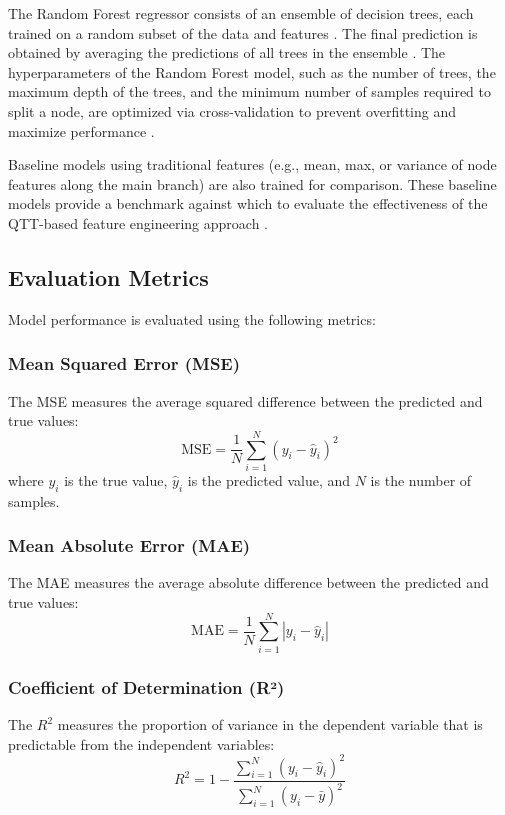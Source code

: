 \documentclass[twocolumn]{aastex631}
\begin{document}
The Random Forest regressor consists of an ensemble of decision trees, each trained on a random subset of the data and features \citep{reis2018probabilisticrandomforestmachine}. The final prediction is obtained by averaging the predictions of all trees in the ensemble \citep{reis2018probabilisticrandomforestmachine}. The hyperparameters of the Random Forest model, such as the number of trees, the maximum depth of the trees, and the minimum number of samples required to split a node, are optimized via cross-validation to prevent overfitting and maximize performance \citep{reis2018probabilisticrandomforestmachine}.

Baseline models using traditional features (e.g., mean, max, or variance of node features along the main branch) are also trained for comparison. These baseline models provide a benchmark against which to evaluate the effectiveness of the QTT-based feature engineering approach \citep{fujita2019haloconcentrationsnewbaseline}.

\subsection{Evaluation Metrics}
Model performance is evaluated using the following metrics: \citep{mishrasharma2024paperclipassociatingastronomicalobservations,narkedimilli2024predictingstellarmetallicitycomparative,raghav2024photometricanalysispredictingstar}

\subsubsection{Mean Squared Error (MSE)}
The MSE measures the average squared difference between the predicted and true values:
\[
\text{MSE} = \frac{1}{N} \sum_{i=1}^{N} (y_i - \hat{y}_i)^2
\]
\citep{prelogović2022machinelearningastrophysics21}
where \(y_i\) is the true value, \(\hat{y}_i\) is the predicted value, and \(N\) is the number of samples.

\subsubsection{Mean Absolute Error (MAE)}
The MAE measures the average absolute difference between the predicted and true values:
\[
\text{MAE} = \frac{1}{N} \sum_{i=1}^{N} |y_i - \hat{y}_i|
\]
\citep{raghav2024photometricanalysispredictingstar}

\subsubsection{Coefficient of Determination (R²)}
The \(R^2\) measures the proportion of variance in the dependent variable that is predictable from the independent variables:
\[
R^2 = 1 - \frac{\sum_{i=1}^{N} (y_i - \hat{y}_i)^2}{\sum_{i=1}^{N} (y_i - \bar{y})^2}
\]
\citep{narkedimilli2024predictingstellarmetallicitycomparative,raghav2024photometricanalysispredictingstar}
\end{document}

